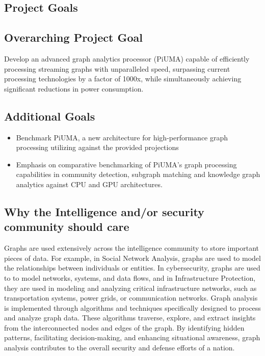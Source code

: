 \documentclass[letterpaper, 10pt]{article}
\begin{document}
\clearpage
\begin{multicols}{2}    
    \section{Project Goals}
        \subsection{Overarching Project Goal}
        Develop an advanced graph analytics processor (PiUMA) capable of efficiently processing streaming graphs with unparalleled speed, surpassing current processing technologies by a factor of 1000x, while simultaneously achieving significant reductions in power consumption. 
        \subsection{Additional Goals}
        \begin{itemize}
        \item Benchmark PiUMA, a new architecture for high-performance graph processing utilizing against the provided projections 
        \item Emphasis on comparative benchmarking of PiUMA’s graph processing capabilities in community detection, subgraph matching and knowledge graph analytics against CPU and GPU architectures.
        \end{itemize}

        \subsection{Why the Intelligence and/or security community should care}
        Graphs are used extensively across the intelligence community to store important pieces of data. For example, in Social Network Analysis, graphs are used to model the relationships between individuals or entities. In cybersecurity, graphs are used to to model networks, systems, and data flows, and in Infrastructure Protection, they are used in modeling and analyzing critical infrastructure networks, such as transportation systems, power grids, or communication networks. 
        Graph analysis is implemented through algorithms and techniques specifically designed to process and analyze graph data. These algorithms traverse, explore, and extract insights from the interconnected nodes and edges of the graph. By identifying hidden patterns, facilitating decision-making, and enhancing situational awareness, graph analysis contributes to the overall security and defense efforts of a nation. 
        

\end{multicols}
\end{document}
